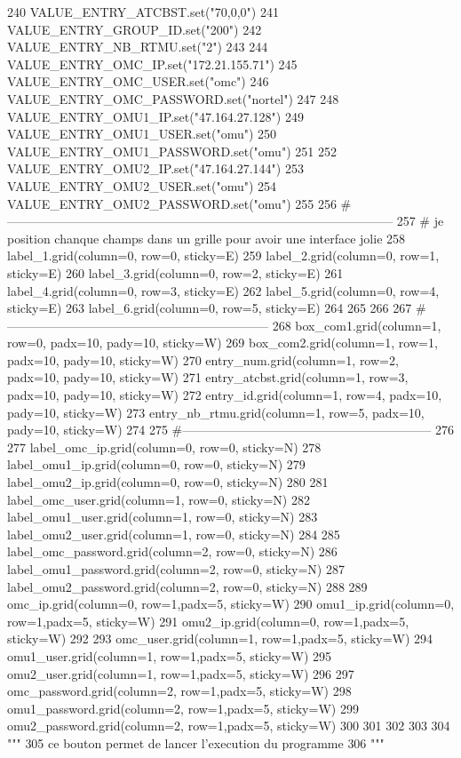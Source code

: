 \begin{DoxyCode}
240     VALUE\_ENTRY\_ATCBST.set(\textcolor{stringliteral}{"70,0,0"})
241     VALUE\_ENTRY\_GROUP\_ID.set(\textcolor{stringliteral}{"200"})
242     VALUE\_ENTRY\_NB\_RTMU.set(\textcolor{stringliteral}{"2"})
243 
244     VALUE\_ENTRY\_OMC\_IP.set(\textcolor{stringliteral}{"172.21.155.71"})
245     VALUE\_ENTRY\_OMC\_USER.set(\textcolor{stringliteral}{"omc"})
246     VALUE\_ENTRY\_OMC\_PASSWORD.set(\textcolor{stringliteral}{"nortel"})
247 
248     VALUE\_ENTRY\_OMU1\_IP.set(\textcolor{stringliteral}{"47.164.27.128"})
249     VALUE\_ENTRY\_OMU1\_USER.set(\textcolor{stringliteral}{"omu"})
250     VALUE\_ENTRY\_OMU1\_PASSWORD.set(\textcolor{stringliteral}{"omu"})
251 
252     VALUE\_ENTRY\_OMU2\_IP.set(\textcolor{stringliteral}{"47.164.27.144"})
253     VALUE\_ENTRY\_OMU2\_USER.set(\textcolor{stringliteral}{"omu"})
254     VALUE\_ENTRY\_OMU2\_PASSWORD.set(\textcolor{stringliteral}{"omu"})
255 
256 \textcolor{comment}{#---------------------------------------------------------------------------------------------
}
257     \textcolor{comment}{# je position chanque champs dans un grille pour avoir une interface jolie
}
258     label\_1.grid(column=0, row=0, sticky=E)
259     label\_2.grid(column=0, row=1, sticky=E)
260     label\_3.grid(column=0, row=2, sticky=E)
261     label\_4.grid(column=0, row=3, sticky=E)
262     label\_5.grid(column=0, row=4, sticky=E)
263     label\_6.grid(column=0, row=5, sticky=E)
264 
265 
266 
267 \textcolor{comment}{#---------------------------------------------------------------
}
268     box\_com1.grid(column=1, row=0, padx=10, pady=10, sticky=W)
269     box\_com2.grid(column=1, row=1, padx=10, pady=10, sticky=W)
270     entry\_num.grid(column=1, row=2, padx=10, pady=10, sticky=W)
271     entry\_atcbst.grid(column=1, row=3, padx=10, pady=10, sticky=W)
272     entry\_id.grid(column=1, row=4, padx=10, pady=10, sticky=W)
273     entry\_nb\_rtmu.grid(column=1, row=5, padx=10, pady=10, sticky=W)
274 
275 \textcolor{comment}{#------------------------------------------------------------
}
276 
277     label\_omc\_ip.grid(column=0, row=0, sticky=N)
278     label\_omu1\_ip.grid(column=0, row=0, sticky=N)
279     label\_omu2\_ip.grid(column=0, row=0, sticky=N)
280 
281     label\_omc\_user.grid(column=1, row=0, sticky=N)
282     label\_omu1\_user.grid(column=1, row=0, sticky=N)
283     label\_omu2\_user.grid(column=1, row=0, sticky=N)
284 
285     label\_omc\_password.grid(column=2, row=0, sticky=N)
286     label\_omu1\_password.grid(column=2, row=0, sticky=N)
287     label\_omu2\_password.grid(column=2, row=0, sticky=N)
288 
289     omc\_ip.grid(column=0, row=1,padx=5, sticky=W)
290     omu1\_ip.grid(column=0, row=1,padx=5, sticky=W)
291     omu2\_ip.grid(column=0, row=1,padx=5, sticky=W)
292 
293     omc\_user.grid(column=1, row=1,padx=5, sticky=W)
294     omu1\_user.grid(column=1, row=1,padx=5, sticky=W)
295     omu2\_user.grid(column=1, row=1,padx=5, sticky=W)
296 
297     omc\_password.grid(column=2, row=1,padx=5, sticky=W)
298     omu1\_password.grid(column=2, row=1,padx=5, sticky=W)
299     omu2\_password.grid(column=2, row=1,padx=5, sticky=W)
300 
301 
302 
303 
304 \textcolor{stringliteral}{"""
}
305 \textcolor{stringliteral}{ce bouton permet de lancer l'execution du programme 
}
306 \textcolor{stringliteral}{"""}
\end{DoxyCode}
